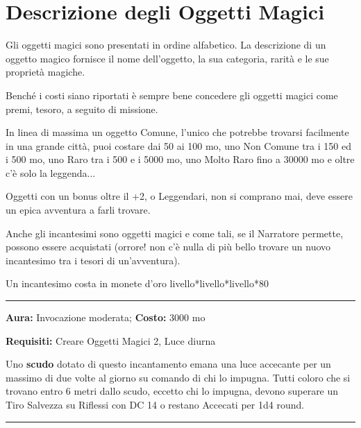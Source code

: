 \section{Descrizione degli Oggetti Magici}

\begin{multicols}{2}

Gli oggetti magici sono presentati in ordine alfabetico. La descrizione di un oggetto magico fornisce il nome dell'oggetto, la sua categoria, rarità e le sue proprietà magiche.

Benché i costi siano riportati è sempre bene concedere gli oggetti magici come premi, tesoro, a seguito di missione.

In linea di massima un oggetto Comune, l'unico che potrebbe trovarsi facilmente in una grande città, puoi costare dai 50 ai 100 mo, uno Non Comune tra i 150 ed i 500 mo, uno Raro tra i 500 e i 5000 mo, uno Molto Raro fino a 30000 mo e oltre c'è solo la leggenda...

Oggetti con un bonus oltre il +2, o Leggendari, non si comprano mai, deve essere un epica avventura a farli trovare.

\medskip

Anche gli incantesimi sono oggetti magici e come tali, se il Narratore permette, possono essere acquistati (orrore! non c'è nulla di più bello trovare un nuovo incantesimo tra i tesori di un'avventura).

Un incantesimo costa in monete d'oro livello*livello*livello*80

\medskip

\smallskip\noindent\rule{\linewidth}{2pt}  \hypertarget{Accecante}{}\medskip{}\noindent\label{Accecante}

\textbf{Aura:} Invocazione moderata; \textbf{Costo:} 3000 mo

\textbf{Requisiti:} Creare Oggetti Magici 2, Luce diurna

Uno \textbf{scudo} dotato di questo incantamento emana una luce accecante per un massimo di due volte al giorno su comando di chi lo impugna. Tutti coloro che si trovano entro 6 metri dallo scudo, eccetto chi lo impugna, devono superare un Tiro Salvezza su Riflessi con DC 14 o restano Accecati per 1d4 round.

\smallskip\noindent\rule{\linewidth}{2pt}  \hypertarget{AccumulaIncantesimi}{}\medskip{}\noindent\label{AccumulaIncantesimi}


\end{multicols}
